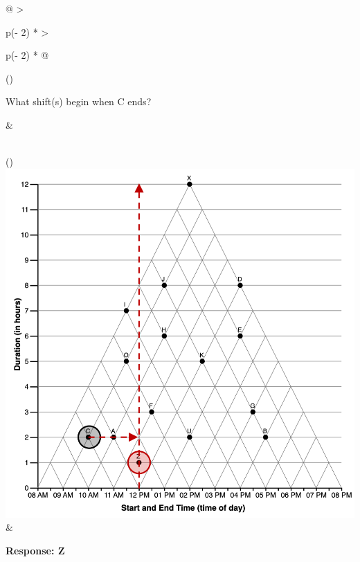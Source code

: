 \documentclass[
  letterpaper,
  DIV=11,
  numbers=noendperiod]{scrreprt}
\begin{document}
\begin{longtable}[]{@{}
  >{\raggedright\arraybackslash}p{(\columnwidth - 2\tabcolsep) * }
  >{\raggedright\arraybackslash}p{(\columnwidth - 2\tabcolsep) * }@{}}
\toprule()
\begin{minipage}[b]{\linewidth}\raggedright
What shift(s) begin when C ends?
\end{minipage} & \begin{minipage}[b]{\linewidth}\raggedright
\end{minipage} \\
\midrule()
\endhead
\includegraphics{analysis/SGC3A/static/interpretations/Q3_111_Z.png} &
\begin{minipage}[t]{\linewidth}\raggedright
\textbf{Response: Z}


\end{minipage}
\end{longtable}
\end{document}
